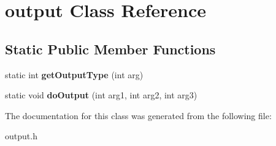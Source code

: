 \section{output Class Reference}
\label{classoutput}
\subsection*{Static Public Member Functions}
\begin{DoxyCompactItemize}
\item 
static int {\bfseries get\+Output\+Type} (int arg)\label{classoutput_a352aa4af657ff6b90a32d1d90a3cab10}

\item 
static void {\bfseries do\+Output} (int arg1, int arg2, int arg3)\label{classoutput_a346804579b1f86348f994cc1cc505488}

\end{DoxyCompactItemize}


The documentation for this class was generated from the following file\+:\begin{DoxyCompactItemize}
\item 
output.\+h\end{DoxyCompactItemize}
